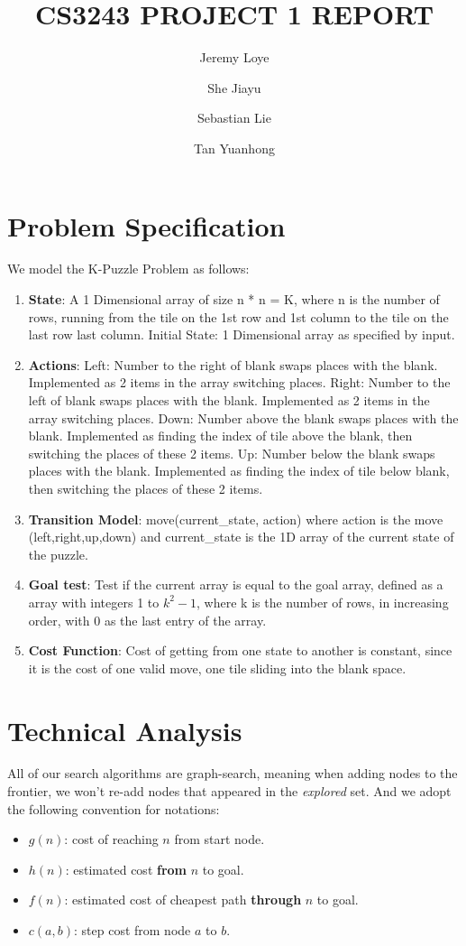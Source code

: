 \documentclass{llncs}
\begin{document}
\title{CS3243 PROJECT 1 REPORT}
\author{Jeremy Loye \and She Jiayu \and Sebastian Lie \and Tan Yuanhong}
\maketitle
\section{Problem Specification}
We model the K-Puzzle Problem as follows:
\begin{enumerate}
	\item \textbf{State}: A 1 Dimensional array of size n * n = K, where n is the number of rows, running from the tile on the 1st row and 1st column to the tile on the last row last column. Initial State: 1 Dimensional array as specified by input.
	\item \textbf{Actions}: Left: Number to the right of blank swaps places with the blank. Implemented as 2 items in the array switching places. Right:  Number to the left of blank swaps places with the blank. Implemented as 2 items in the array switching places. Down: Number above the blank swaps places with the blank. Implemented as finding the index of tile above the blank, then switching the places of these 2 items. Up: Number below the blank swaps places with the blank. Implemented as finding the index of tile below blank, then switching the places of these 2 items.
	\item \textbf{Transition Model}: move(current\_state, action) where action is the move (left,right,up,down) and current\_state is the 1D array of the current state of the puzzle.
	\item \textbf{Goal test}: Test if the current array is equal to the goal array, defined as a array with integers 1 to $k^2 - 1$, where k is the number of rows, in increasing order, with 0 as the last entry of the array.
	\item \textbf{Cost Function}: Cost of getting from one state to another is constant, since it is the cost of one valid move, one tile sliding into the blank space.
\end{enumerate}

\section{Technical Analysis}
All of our search algorithms are graph-search, meaning when adding nodes to the frontier, we won’t re-add nodes that appeared in the \emph{explored} set. And we adopt the following convention for notations:
\begin{itemize}
	\item $g(n)$: cost of reaching $n$ from start node.
	\item $h(n)$: estimated cost \textbf{from} $n$ to goal.
	\item $f(n)$: estimated cost of cheapest path \textbf{through} $n$ to goal.
	\item $c(a,b)$: step cost from node $a$ to $b$.
\end{itemize}
\end{document}
